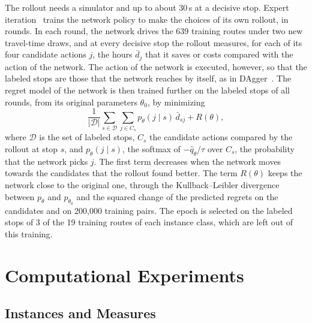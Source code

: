 \documentclass[runningheads]{llncs}
\begin{document}
The rollout needs a simulator and up to about 30\,s at a decisive stop. Expert
iteration~\cite{anthony2017} trains the network policy to make the choices of
its own rollout, in rounds. In each round, the network drives the 639 training
routes under two new travel-time draws, and at every decisive stop the rollout
measures, for each of its four candidate actions $j$, the hours $\bar d_j$ that
it saves or costs compared with the action of the network. The action of the
network is executed, however, so that the labeled stops are those that the
network reaches by itself, as in DAgger~\cite{ross2011}. The regret model of
the network is then trained further on the labeled stops of all rounds, from
its original parameters $\theta_0$, by minimizing
\begin{equation}
\frac{1}{|\mathcal{D}|}\sum_{s\in\mathcal{D}}\sum_{j\in
C_s}p_\theta(j\mid s)\,\bar d_{sj}+R(\theta),
\label{eq:exit}
\end{equation}
where $\mathcal{D}$ is the set of labeled stops, $C_s$ the candidate actions
compared by the rollout at stop $s$, and $p_\theta(j\mid s)$, the softmax of
$-\hat q_\theta/\tau$ over $C_s$, the probability that the network picks $j$.
The first term decreases when the network moves towards the candidates that
the rollout found better. The term $R(\theta)$ keeps the
network close to the original one, through the Kullback--Leibler divergence
between $p_\theta$ and $p_{\theta_0}$ and the squared change of the predicted
regrets on the candidates and on 200{,}000 training pairs. The epoch is
selected on the labeled stops of 3 of the 19 training routes of each instance
class, which are left out of this training.

\section{Computational Experiments}
\label{sec:exp}

\subsection{Instances and Measures}
\label{sec:setup}
\end{document}
